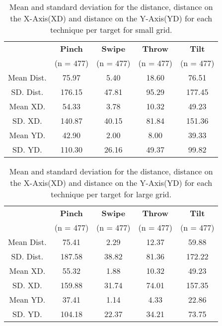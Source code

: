 \begin{table}[H]
	\centering
	\begin{tabular}{|c|c|c|c|c|}
		\hline
		\rowcolor[HTML]{9B9B9B} 
		& \textbf{Pinch} & \textbf{Swipe} & \textbf{Throw} & \textbf{Tilt} \\
		\rowcolor[HTML]{9B9B9B} 
		& (n = 477) & (n = 477) & (n = 477) & (n = 477) \\ \hline
		Mean Dist. & 75.97 & 5.40 & 18.60          & 76.51         \\ \hline
		SD. Dist. & 176.15 & 47.81 & 95.29 & 177.45 \\ \hline
		Mean XD. & 54.33 & 3.78 & 10.32 & 49.23 \\ \hline
		SD. XD. & 140.87 & 40.15 & 81.84 & 151.36 \\ \hline
		Mean YD. & 42.90 & 2.00 & 8.00 & 39.33 \\ \hline
		SD. YD. & 110.30 & 26.16 & 49.37 & 99.82 \\ \hline
	\end{tabular}
	\caption{Mean and standard deviation for the distance, distance on the X-Axis(XD) and distance on the Y-Axis(YD) for each technique per target for small grid.}
	\label{tab:distanceSmall}
\end{table}

\begin{table}[H]
	\centering
	\begin{tabular}{|c|c|c|c|c|}
		\hline
		\rowcolor[HTML]{9B9B9B} 
		& \textbf{Pinch} & \textbf{Swipe} & \textbf{Throw} & \textbf{Tilt} \\
		\rowcolor[HTML]{9B9B9B} 
		& (n = 477) & (n = 477) & (n = 477) & (n = 477) \\ \hline
		Mean Dist. & 75.41 & 2.29 & 12.37 & 59.88         \\ \hline
		SD. Dist. & 187.58 & 38.82 & 81.36 & 172.22 \\ \hline
		Mean XD. & 55.32 & 1.88 & 10.32 & 49.23 \\ \hline
		SD. XD. & 159.88 & 31.74 & 74.01 & 157.35 \\ \hline
		Mean YD. & 37.41 & 1.14 & 4.33 & 22.86 \\ \hline
		SD. YD. & 104.18 & 22.37 & 34.21 & 73.75 \\ \hline
	\end{tabular}
	\caption{Mean and standard deviation for the distance, distance on the X-Axis(XD) and distance on the Y-Axis(YD) for each technique per target for large grid.}
	\label{tab:distanceLarge}
\end{table} 